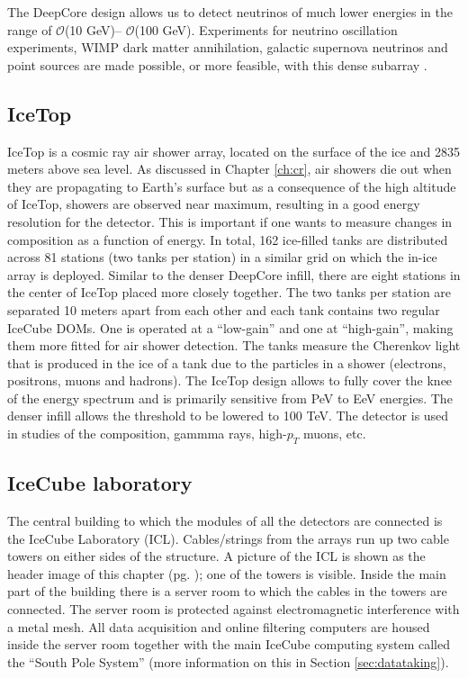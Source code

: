 The DeepCore design allows us to detect neutrinos of much lower energies in the range of $\mathcal{O}$(10 GeV)– $\mathcal{O}$(100 GeV). Experiments for neutrino oscillation experiments, WIMP dark matter annihilation, galactic supernova neutrinos and point sources are made possible, or more feasible, with this dense subarray \cite{Collaboration:2011ym}.

\subsection{IceTop}
IceTop is a cosmic ray air shower array, located on the surface of the ice and 2835 meters above sea level. As discussed in Chapter \ref{ch:cr}, air showers die out when they are propagating to Earth's surface but as a consequence of the high altitude of IceTop, showers are observed near maximum, resulting in a good energy resolution for the detector. This is important if one wants to measure changes in composition as a function of energy. In total, 162 ice-filled tanks are distributed across 81 stations (two tanks per station) in a similar grid on which the in-ice array is deployed. Similar to the denser DeepCore infill, there are eight stations in the center of IceTop placed more closely together. The two tanks per station are separated 10 meters apart from each other and each tank contains two regular IceCube DOMs. One is operated at a ``low-gain'' and one at ``high-gain'', making them more fitted for air shower detection. The tanks measure the Cherenkov light that is produced in the ice of a tank due to the particles in a shower (electrons, positrons, muons and hadrons). The IceTop design allows to fully cover the knee of the energy spectrum and is primarily sensitive from PeV to EeV energies. The denser infill allows the threshold to be lowered to 100 TeV. The detector is used in studies of the composition, gammma rays, high-$p_T$ muons, etc. 

\subsection{IceCube laboratory}
The central building to which the modules of all the detectors are connected is the IceCube Laboratory (ICL). Cables/strings from the arrays run up two cable towers on either sides of the structure. A picture of the ICL is shown as the header image of this chapter (pg. \pageref{ch:icecube}); one of the towers is visible. Inside the main part of the building there is a server room to which the cables in the towers are connected. The server room is protected against electromagnetic interference with a metal mesh. All data acquisition and online filtering computers are housed inside the server room together with the main IceCube computing system called the ``South Pole System'' (more information on this in Section \ref{sec:datataking}). 
